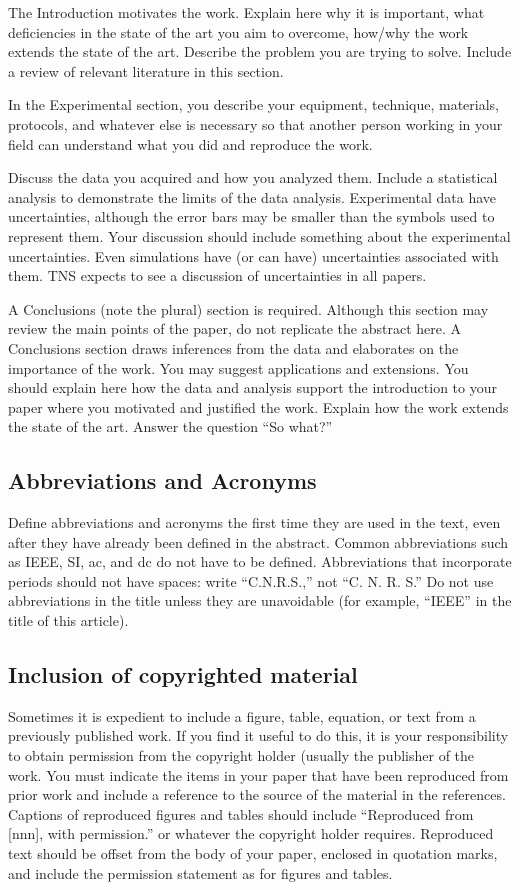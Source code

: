 \documentclass{IEEEtran}
\begin{document}
The Introduction motivates the work. Explain here why it is important, what
deficiencies in the state of the art you aim to overcome, how/why the work
extends the state of the art. Describe the problem you are trying to solve.
Include a review of relevant literature in this section.

In the Experimental section, you describe your equipment, technique,
materials, protocols, and whatever else is necessary so that another person
working in your field can understand what you did and reproduce the work.

Discuss the data you acquired and how you analyzed them. Include a
statistical analysis to demonstrate the limits of the data analysis.
Experimental data have uncertainties, although the error bars may be smaller
than the symbols used to represent them. Your discussion should include
something about the experimental uncertainties. Even simulations have (or
can have) uncertainties associated with them. TNS expects to see a
discussion of uncertainties in all papers.

A Conclusions (note the plural) section is required. Although this section
may review the main points of the paper, do not replicate the abstract here.
A Conclusions section draws inferences from the data and elaborates on the
importance of the work. You may suggest applications and extensions. You
should explain here how the data and analysis support the introduction to
your paper where you motivated and justified the work. Explain how the work
extends the state of the art. Answer the question ``So what?''

\subsection{Abbreviations and Acronyms}
Define abbreviations and acronyms the first time they are used in the text,
even after they have already been defined in the abstract. Common
abbreviations such as IEEE, SI, ac, and dc do not have to be defined.
Abbreviations that incorporate periods should not have spaces: write
``C.N.R.S.,'' not ``C. N. R. S.'' Do not use abbreviations in the title
unless they are unavoidable (for example, ``IEEE'' in the title of this
article).

\subsection{Inclusion of copyrighted material}
Sometimes it is expedient to include a figure, table, equation, or text from
a previously published work. If you find it useful to do this, it is your
responsibility to obtain permission from the copyright holder (usually the
publisher of the work. You must indicate the items in your paper that have
been reproduced from prior work and include a reference to the source of the
material in the references. Captions of reproduced figures and tables should
include ``Reproduced from [nnn], with permission.'' or whatever the
copyright holder requires. Reproduced text should be offset from the body of
your paper, enclosed in quotation marks, and include the permission
statement as for figures and tables.
\end{document}
